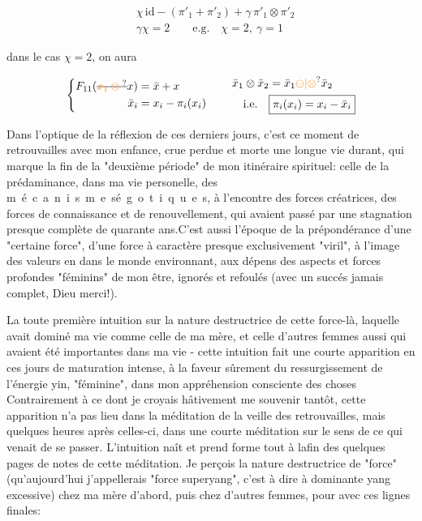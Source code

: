 \[
\boxed{\begin{aligned}
 &\chi\,\mathrm{id}-(\pi'_1+\pi'_2)+\gamma\,\pi'_1\otimes\pi'_2\\
 &\gamma\chi=2\qquad \text{e.g.}\quad\chi=2,\ \gamma=1
\end{aligned}}
\]

dans le cas $\chi=2$, on aura

\[
\left\{\begin{aligned}
 F_{11}(\deleted{\unsure{x_1\otimes{}}}x)&=\bar x+x\\
 \bar x_i&=x_i-\pi_i(x_i)
\end{aligned}\right.
\qquad
\begin{aligned}
\bar{x}_1\otimes\bar{x}_2&=\bar{x}_1\unsure{\ominus|\otimes}\bar{x}_2\\
\text{i.e.}\quad &\boxed{\pi_i(x_i)=x_i-\bar x_i}
\end{aligned}
\]




Dans l'optique de la réflexion de ces derniers jours, c'est ce moment de retrouvailles avec mon enfance, crue perdue et morte une longue vie durant, qui marque la fin de la "deuxième période" de mon itinéraire spirituel: celle de la prédaminance, dans ma vie personelle, des \mbox{m é c a n i s m e s}\quad\mbox{é g o t i q u e s}, à l'encontre des forces créatrices, des forces de connaissance et de renouvellement, qui avaient passé par une stagnation presque complète de quarante ans.C'est aussi l'époque de la prépondérance d'une "certaine force", d'une force à caractère presque exclusivement "viril", à l'image des valeurs en  dans le monde environnant, aux dépens des aspects et forces profondes "féminins" de mon être, ignorés et refoulés (avec un succés jamais complet, Dieu merci!).

La toute première intuition sur la nature destructrice de cette force-là, laquelle avait dominé ma vie comme celle de ma mère, et celle d'autres femmes aussi qui avaient été importantes dans ma vie - cette intuition fait une courte apparition en ces jours de maturation intense, à la faveur sûrement du ressurgissement de l'énergie yin, "féminine", dans mon appréhension consciente des choses Contrairement à ce dont je croyais hâtivement me souvenir tantôt, cette apparition n'a pas lieu dans la méditation de la veille des retrouvailles, mais quelques heures après celles-ci, dans une courte méditation sur le sens de ce qui venait de se passer. L'intuition naît et prend forme tout à lafin des quelques pages de notes de cette méditation. Je perçois la nature destructrice de  "force" (qu'aujourd'hui j'appellerais "force superyang", c'est à dire à dominante yang excessive) chez ma mère d'abord, puis chez d'autres femmes, pour  avec ces lignes finales:

